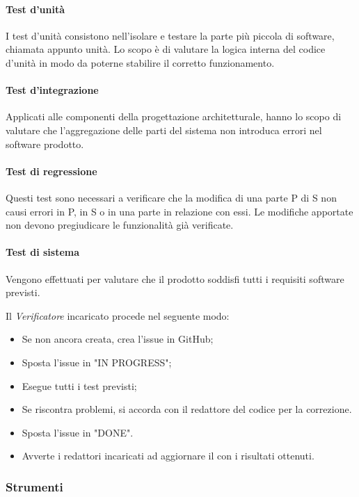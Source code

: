 \paragraph*{Test d'unità}
I test d'unità consistono nell'isolare e testare la parte più piccola di software, chiamata appunto unità. Lo scopo è di valutare la logica interna del codice d'unità in modo da poterne stabilire il corretto funzionamento. 
\paragraph*{Test d'integrazione}
Applicati alle componenti della progettazione architetturale, hanno lo scopo di valutare che l'aggregazione delle parti del sistema non introduca errori nel software prodotto.
\paragraph*{Test di regressione}
Questi test sono necessari a verificare che la modifica di una parte P di S non causi errori in P, in S o in una parte in relazione con essi. Le modifiche apportate non devono pregiudicare le funzionalità già verificate. 
\paragraph*{Test di sistema}
Vengono effettuati per valutare che il prodotto soddisfi tutti i requisiti software previsti.

\label{ProceduraVerifica}
Il \textit{Verificatore} incaricato procede nel seguente modo:
\begin{itemize}
	\item Se non ancora creata, crea l'issue in GitHub;
	\item Sposta l'issue in "IN PROGRESS";
	\item Esegue tutti i test previsti;
	\item Se riscontra problemi, si accorda con il redattore del codice per la correzione. 
	\item Sposta l'issue in "DONE".
	\item Avverte i redattori incaricati ad aggiornare il \PdQv{} con i risultati ottenuti.
\end{itemize}


\subsubsection{Strumenti}
